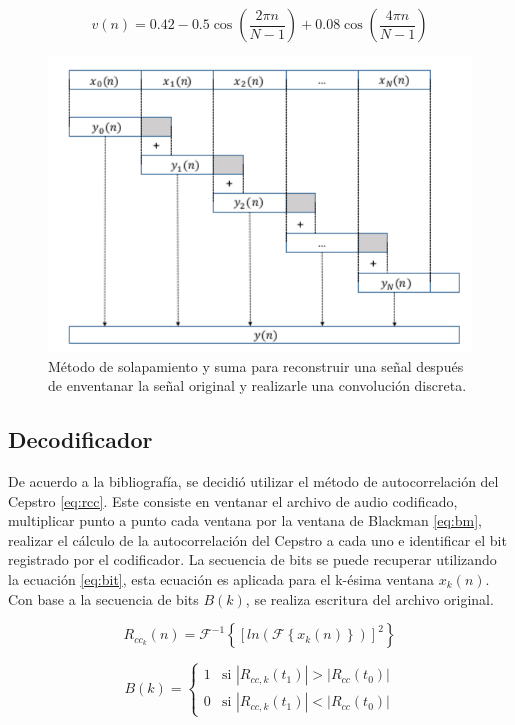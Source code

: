 \documentclass[conference]{IEEEtran}
\begin{document}
\begin{equation}
v(n)=0.42 - 0.5 \cos \left(  \frac{2\pi n}{N-1}\right) + 0.08 \cos \left(  \frac{4\pi n}{N-1}\right)
\label{eq:bm}
\end{equation}

\begin{figure}[h]
\centering
\includegraphics[scale=0.6]{solapadd.pdf}
\caption{Método de solapamiento y suma para reconstruir una señal después de enventanar la señal original y realizarle una convolución discreta.}
\label{fig:solapadd}
\end{figure}

\subsection{Decodificador}
De acuerdo a la bibliografía, se decidió utilizar el método de autocorrelación del Cepstro \eqref{eq:rcc}. Este consiste en ventanar el archivo de audio codificado, multiplicar punto a punto cada ventana por la ventana de Blackman \eqref{eq:bm}, realizar el cálculo de la autocorrelación del Cepstro a cada uno e identificar el bit registrado por el codificador. La secuencia de bits se puede recuperar utilizando la ecuación \eqref{eq:bit}, esta ecuación es aplicada para el k-ésima ventana $x_k(n)$. Con base a la secuencia de bits $B(k)$, se realiza escritura del archivo original.

\begin{equation}
R_{cc_k}(n) = \mathscr{F}^{-1} \left \{  [ln( \mathscr{F} \left \{ x_k(n) \right \} )]^2 \right \}
\label{eq:rcc}
\end{equation}

\begin{equation}
B(k) = \begin{cases}
1 &\text{si $|R_{cc,k}(t_1)|>|R_{cc}(t_0)|$}\\
0 &\text{si $|R_{cc,k}(t_1)|<|R_{cc}(t_0)|$}
\end{cases}
\label{eq:bit}
\end{equation}
\end{document}
